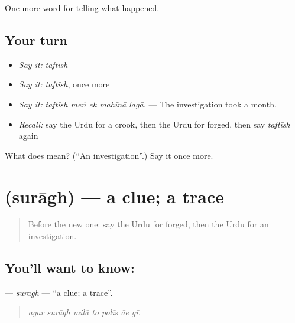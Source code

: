 \begin{grammarlens}[title={What you've built}]
One more word for telling what happened.
\end{grammarlens}

\subsection*{Your turn}
\begin{itemize}
\raggedright
  \item \emph{Say it:} \emph{taftīsh}
  \item \emph{Say it:} \emph{taftīsh}, once more
  \item \emph{Say it:} \emph{taftīsh meṅ ek mahīnā lagā.} — The investigation took a month.
  \item \emph{Recall:} say the Urdu for a crook, then the Urdu for forged, then say \emph{taftīsh} again
\end{itemize}

\begin{tcolorbox}[breakable,colback=teal!4,colframe=teal!35!black,title={Before you move on}]
What does  mean? (\textquotedblleft{}An investigation\textquotedblright{}.) Say it once more.
\end{tcolorbox}
\section[\texorpdfstring{\ur{سراغ} (surāgh)}{سراغ (surāgh)}]{ (surāgh) — a clue; a trace}

\label{lesson:UR-C282-suragh}



\begin{quote}
Before the new one: say the Urdu for forged, then the Urdu for an investigation.
\end{quote}

\subsection*{You'll want to know: }
\textbf{} — \emph{surāgh} — \textquotedblleft{}a clue; a trace\textquotedblright{}.

\begin{quote}
      
\end{quote}

\begin{quote}
\emph{agar surāgh milā to polīs āe gī.}
\end{quote}

